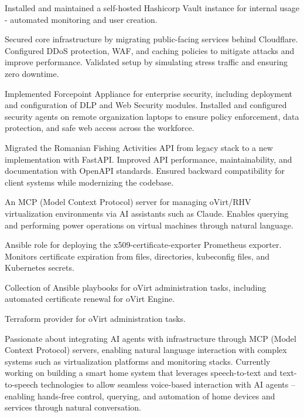 \documentclass[10pt,a4paper,ragged2e,withhyper]{altacv}
\begin{document}
Installed and maintained a self-hosted Hashicorp Vault instance for internal usage - automated  monitoring and user creation.


Secured core infrastructure by migrating public-facing services behind Cloudflare. Configured DDoS protection, WAF, and caching policies to mitigate attacks and improve performance. Validated setup by simulating stress traffic and ensuring zero downtime.


Implemented Forcepoint Appliance for enterprise security, including deployment and configuration of DLP and Web Security modules. Installed and configured security agents on remote organization laptops to ensure policy enforcement, data protection, and safe web access across the workforce.


Migrated the Romanian Fishing Activities API from legacy stack to a new implementation with FastAPI. Improved API performance, maintainability, and documentation with OpenAPI standards. Ensured backward compatibility for client systems while modernizing the codebase.



An MCP (Model Context Protocol) server for managing oVirt/RHV virtualization environments via AI assistants such as Claude. Enables querying and performing power operations on virtual machines through natural language.

Ansible role for deploying the x509-certificate-exporter Prometheus exporter. Monitors certificate expiration from files, directories, kubeconfig files, and Kubernetes secrets.

Collection of Ansible playbooks for oVirt administration tasks, including automated certificate renewal for oVirt Engine.

Terraform provider for oVirt administration tasks.


Passionate about integrating AI agents with infrastructure through MCP (Model Context Protocol) servers, enabling natural language interaction with complex systems such as virtualization platforms and monitoring stacks. Currently working on building a smart home system that leverages speech-to-text and text-to-speech technologies to allow seamless voice-based interaction with AI agents -- enabling hands-free control, querying, and automation of home devices and services through natural conversation.
\end{document}
